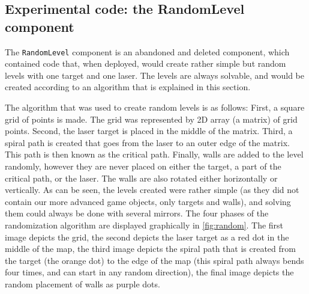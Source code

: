\subsection{Experimental code: the RandomLevel component} \label{ssec:randomlevelcomponent}
			The \texttt{RandomLevel} component is an abandoned and deleted
			component, which contained code that, when deployed, would create
			rather simple but random levels with one target and one laser.
			The levels are always solvable, and would be created according 
			to an algorithm that is explained in this section.
			
			The algorithm that was used to create random levels is as follows:
			First, a square grid of points is made. The grid was represented by
			2D array (a matrix) of grid points. Second, the laser target is
			placed in the middle of the matrix. Third, a spiral path is created that
			goes from the laser to an outer edge of the matrix. This path is then
			known as the critical path. Finally, walls are added to the level randomly,
			however they are never placed on either the target, a part of the
			critical path, or the laser. The walls are also rotated either
			horizontally or vertically. As can be seen, the levels created were
			rather simple (as they did not contain our more advanced game
			objects, only targets and walls), and solving them could always be done
			with several mirrors. The four phases of the randomization algorithm
			are displayed graphically in \ref{fig:random}. The first image depicts
			the grid, the second depicts the laser target as a red dot in the
			middle of the map, the third image depicts the spiral path that
			is created from the target (the orange dot) to the edge of the map 
			(this spiral path always bends four times, and can start in any 
			random direction), the final image depicts the random placement of
			walls as purple dots.
			
